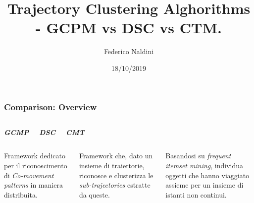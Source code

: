 \documentclass{beamer}
\title[Trajectory Clustering Comparison]{Trajectory Clustering Alghorithms - GCPM vs DSC vs CTM. } %
\author{Federico Naldini} %
\institute[Università di Bologna] %
{
Alma Mater Studiorum - Università di Bologna, Cesena. \\ %
\medskip
\textit{federico.naldini3@studio.unibo.it} %
}
\date{18/10/2019} %
\begin{document}
\begin{frame}
\titlepage %
\end{frame}


\begin{frame}
	\frametitle{Comparison: Overview}
	\begin{columns}
		
		\begin{center}
			\textbf{\textit{\huge{GCMP}}}
			
		\end{center}
		
		\begin{center}
			\textbf{\textit{\huge{DSC}}}
			
		\end{center}
		
		\begin{center}
			\textbf{\textit{\huge{CMT}}}
			
		\end{center}
	\end{columns}
	\begin{columns}
		
		\column{.3\columnwidth}
		
	Framework dedicato per il riconoscimento di \textit{Co-movement patterns} in maniera distribuita.
		
		
		\column{.3\textwidth}
	
			Framework che, dato un insieme di traiettorie, riconosce e clusterizza le \textit{sub-trajectories} estratte da queste.
		
		\column{.3\textwidth}
		
		Basandosi su \textit{frequent itemset mining}, individua oggetti  che hanno viaggiato assieme per un insieme di istanti non continui.

	\end{columns}
\end{frame}     
\end{document}
